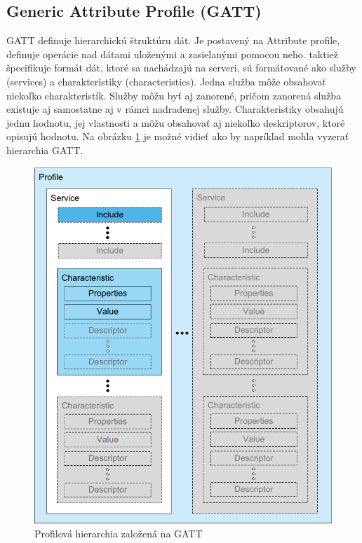 \subsection{Generic Attribute Profile (GATT)}\label{sec:gatt}

GATT definuje hierarchickú štruktúru dát. Je postavený na Attribute profile, definuje operácie nad dátami uloženými a zasielanými pomocou neho. taktiež špecifikuje formát dát, ktoré sa nachádzajú na serveri, sú formátované ako služby (services) a charakteristiky (characteristics). Jedna služba môže obsahovať niekoľko charakteristík. Služby môžu byť aj zanorené, pričom zanorená služba existuje aj samostatne aj v rámci nadradenej služby. Charakteristiky obsahujú jednu hodnotu, jej vlastnosti a môžu obsahovať aj niekoľko deskriptorov, ktoré opisujú hodnotu. Na obrázku \ref{fig:gatt} je možné vidieť ako by napríklad mohla vyzerať hierarchia GATT.\cite{bluetooth}

\begin{figure}[ht]
    \centering
    \includegraphics[scale=0.4]{obrazky-figures/gatt.png}
    \caption[Profilová hierarchia založená na GATT]{Profilová hierarchia založená na GATT\cite{bluetooth}}
    \label{fig:gatt}
\end{figure}



